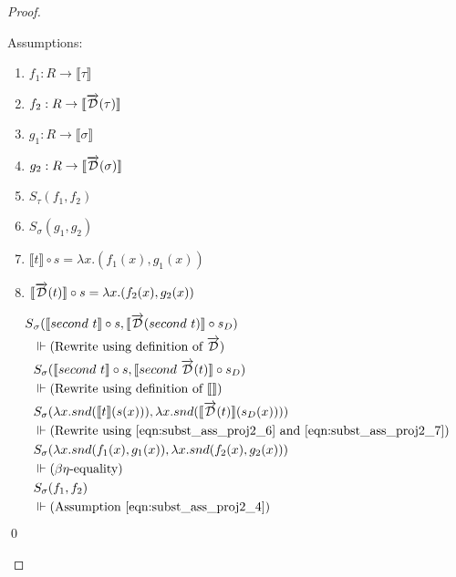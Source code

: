 \documentclass[11pt, final]{article}
\begin{document}
\begin{proof}
\begin{enumerate}
      Assumptions:
      \begin{enumerate}
        \item \label{eqn:subst_ass_proj2_0} $f_1 : R \rightarrow \llbracket \tau \rrbracket$
        \item \label{eqn:subst_ass_proj2_1} $f_2 : R \rightarrow \llbracket \overrightarrow{\mathcal{D}}(\tau) \rrbracket$
        \item \label{eqn:subst_ass_proj2_2} $g_1 : R \rightarrow \llbracket \sigma \rrbracket$
        \item \label{eqn:subst_ass_proj2_3} $g_2 : R \rightarrow \llbracket \overrightarrow{\mathcal{D}}(\sigma) \rrbracket$
        \item \label{eqn:subst_ass_proj2_4} $S_\tau(f_1, f_2)$
        \item \label{eqn:subst_ass_proj2_5} $S_\sigma(g_1, g_2)$
        \item \label{eqn:subst_ass_proj2_6} $\llbracket t \rrbracket \circ s = \lambda x. (f_1(x), g_1(x))$
        \item \label{eqn:subst_ass_proj2_7} $\llbracket \overrightarrow{\mathcal{D}}(t) \rrbracket \circ s = \lambda x. (f_2(x), g_2(x))$
      \end{enumerate}

      \begin{align*}
        S&_{\sigma}(\llbracket second\ t \rrbracket \circ s, \llbracket \overrightarrow{\mathcal{D}}(second\ t) \rrbracket \circ s_D) \\
        & \Vdash \text{(Rewrite using definition of $\overrightarrow{\mathcal{D}}$)} \\
        & S_{\sigma}(\llbracket second\ t \rrbracket \circ s, \llbracket second\ \overrightarrow{\mathcal{D}}(t) \rrbracket \circ s_D) \\
        & \Vdash \text{(Rewrite using definition of $\llbracket\rrbracket$)} \\
        & S_{\sigma}(\lambda x. snd(\llbracket t \rrbracket(s(x))), \lambda x. snd(\llbracket \overrightarrow{\mathcal{D}}(t) \rrbracket(s_D(x)))) \\
        & \Vdash \text{(Rewrite using \ref{eqn:subst_ass_proj2_6} and \ref{eqn:subst_ass_proj2_7})} \\
        & S_{\sigma}(\lambda x. snd(f_1(x), g_1(x)), \lambda x. snd(f_2(x), g_2(x))) \\
        & \Vdash \text{($\beta\eta$-equality)} \\
        & S_{\sigma}(f_1, f_2) \\
        & \Vdash \text{(Assumption \ref{eqn:subst_ass_proj2_4})} \\
      \end{align*} \qed
    \end{enumerate}
  \end{proof}
\end{document}
